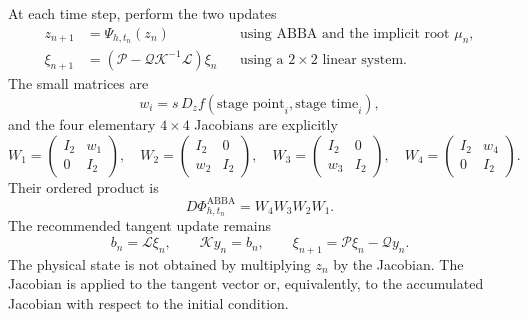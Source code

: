 \documentclass[11pt,a4paper]{article}
\newcommand{\PhiAB}{\Phi^{\mathrm{ABBA}}_{h,t_n}}
\begin{document}
At each time step, perform the two updates
\[
 \boxed{
 \begin{aligned}
 z_{n+1}&=\Psi_{h,t_n}(z_n)
 &&\text{using ABBA and the implicit root }\mu_n,\\[1mm]
 \xi_{n+1}&=
 \left(\mathcal P-\mathcal Q\mathcal K^{-1}\mathcal L\right)\xi_n
 &&\text{using a }2\times2\text{ linear system}.
 \end{aligned}
 }
\]
The small matrices are
\[
 w_i=s\,D_zf(\text{stage point}_i,\text{stage time}_i),
\]
and the four elementary $4\times4$ Jacobians are explicitly
\[
 \boxed{
 W_1=\begin{pmatrix}I_2&w_1\\0&I_2\end{pmatrix},\quad
 W_2=\begin{pmatrix}I_2&0\\w_2&I_2\end{pmatrix},\quad
 W_3=\begin{pmatrix}I_2&0\\w_3&I_2\end{pmatrix},\quad
 W_4=\begin{pmatrix}I_2&w_4\\0&I_2\end{pmatrix}.
 }
\]
Their ordered product is
\[
 D\PhiAB=W_4W_3W_2W_1.
\]
The recommended tangent update remains
\[
 b_n=\mathcal L\xi_n,
 \qquad
 \mathcal K y_n=b_n,
 \qquad
 \xi_{n+1}=\mathcal P\xi_n-\mathcal Qy_n.
\]
The physical state is not obtained by multiplying $z_n$ by the Jacobian. The Jacobian is
applied to the tangent vector or, equivalently, to the accumulated Jacobian with respect
to the initial condition.
\end{document}
